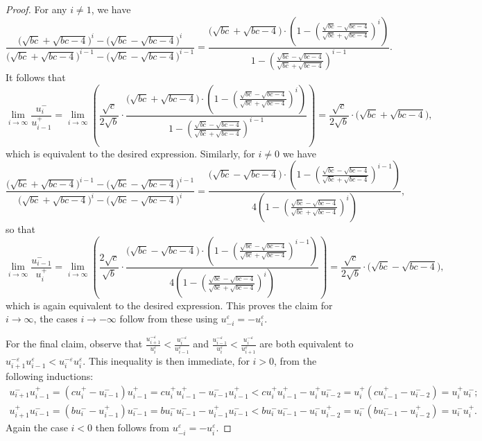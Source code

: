 \documentclass[pdflatex,sn-mathphys]{sn-jnl}%
\theoremstyle{thmstyleone}%
\theoremstyle{thmstyletwo}%
\theoremstyle{thmstylethree}%
\begin{document}
\begin{proof}
    For any $i\ne1$, we have
    \[\frac{\big(\sqrt{bc}+\sqrt{bc-4}\big)^i-\big(\sqrt{bc}-\sqrt{bc-4}\big)^i}{\big(\sqrt{bc}+\sqrt{bc-4}\big)^{i-1}-\big(\sqrt{bc}-\sqrt{bc-4}\big)^{i-1}}=\frac{\big(\sqrt{bc}+\sqrt{bc-4}\big)\cdot\left(1-\left(\frac{\sqrt{bc}-\sqrt{bc-4}}{\sqrt{bc}+\sqrt{bc-4}}\right)^i\right)}{1-\left(\frac{\sqrt{bc}-\sqrt{bc-4}}{\sqrt{bc}+\sqrt{bc-4}}\right)^{i-1}}.\]
    It follows that
    \[\lim_{i\to\infty} \frac{u_i^-}{u_{i-1}^+} = \lim_{i\to\infty} \left( \frac{\sqrt{c}}{2\sqrt{b}}\cdot\frac{\big(\sqrt{bc}+\sqrt{bc-4}\big)\cdot\left(1-\left(\frac{\sqrt{bc}-\sqrt{bc-4}}{\sqrt{bc}+\sqrt{bc-4}}\right)^i\right)}{1-\left(\frac{\sqrt{bc}-\sqrt{bc-4}}{\sqrt{bc}+\sqrt{bc-4}}\right)^{i-1}} \right) = \frac{\sqrt{c}}{2\sqrt{b}}\cdot\big(\sqrt{bc}+\sqrt{bc-4}\big),\]
    which is equivalent to the desired expression.
    Similarly, for $i\ne0$ we have
    \[\frac{\big(\sqrt{bc}+\sqrt{bc-4}\big)^{i-1}-\big(\sqrt{bc}-\sqrt{bc-4}\big)^{i-1}}{\big(\sqrt{bc}+\sqrt{bc-4}\big)^i-\big(\sqrt{bc}-\sqrt{bc-4}\big)^i}=\frac{\big(\sqrt{bc}-\sqrt{bc-4}\big)\cdot\left(1-\left(\frac{\sqrt{bc}-\sqrt{bc-4}}{\sqrt{bc}+\sqrt{bc-4}}\right)^{i-1}\right)}{4\left(1-\left(\frac{\sqrt{bc}-\sqrt{bc-4}}{\sqrt{bc}+\sqrt{bc-4}}\right)^i\right)},\]
    so that
    \[\lim_{i\to\infty} \frac{u_{i-1}^-}{u_i^+} = \lim_{i\to\infty} \left( \frac{2\sqrt{c}}{\sqrt{b}}\cdot\frac{\big(\sqrt{bc}-\sqrt{bc-4}\big)\cdot\left(1-\left(\frac{\sqrt{bc}-\sqrt{bc-4}}{\sqrt{bc}+\sqrt{bc-4}}\right)^{i-1}\right)}{4\left(1-\left(\frac{\sqrt{bc}-\sqrt{bc-4}}{\sqrt{bc}+\sqrt{bc-4}}\right)^i\right)} \right) = \frac{\sqrt{c}}{2\sqrt{b}}\cdot\big(\sqrt{bc}-\sqrt{bc-4}\big),\]
    which is again equivalent to the desired expression.
    This proves the claim for $i\to\infty$, the cases $i\to-\infty$ follow from these using $u_{-i}^\varepsilon=-u_i^\varepsilon$.

    For the final claim, observe that $\frac{u_{i+1}^{-\varepsilon}}{u_i^\varepsilon}<\frac{u_i^{-\varepsilon}}{u_{i-1}^\varepsilon}$ and $\frac{u_{i-1}^{-\varepsilon}}{u_i^\varepsilon}<\frac{u_i^{-\varepsilon}}{u_{i+1}^\varepsilon}$ are both equivalent to $u_{i+1}^{-\varepsilon}u_{i-1}^\varepsilon<u_i^{-\varepsilon}u_i^\varepsilon$.
    This inequality is then immediate, for $i>0$, from the following inductions:
    \begin{align*}
      u_{i+1}^{-}u_{i-1}^+
      =(cu_i^+-u_{i-1}^{-})u_{i-1}^+
      =cu_i^+ u_{i-1}^+-u_{i-1}^{-} u_{i-1}^+
      <cu_i^+ u_{i-1}^+-u_i^+ u_{i-2}^{-}
      =u_i^+(cu_{i-1}^+-u_{i-2}^{-})
      =u_i^+ u_i^{-};
      \\
      u_{i+1}^{+}u_{i-1}^-
      =(bu_i^--u_{i-1}^{+})u_{i-1}^-
      =bu_i^- u_{i-1}^--u_{i-1}^{+} u_{i-1}^-
      <bu_i^- u_{i-1}^--u_i^- u_{i-2}^{+}
      =u_i^-(bu_{i-1}^--u_{i-2}^{+})
      =u_i^- u_i^{+}.
    \end{align*}
    Again the case $i<0$ then follows from $u_{-i}^\varepsilon=-u_i^\varepsilon$.
  \end{proof}
\end{document}
